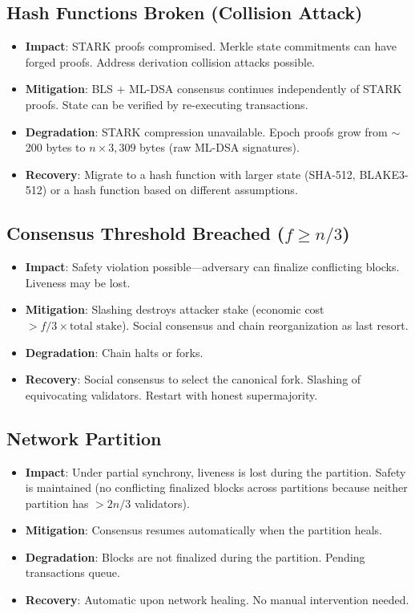 \documentclass[11pt,a4paper]{article}
\begin{document}
\subsection{Hash Functions Broken (Collision Attack)}

\begin{itemize}[leftmargin=2em]
  \item \textbf{Impact}: STARK proofs compromised. Merkle state commitments can have
        forged proofs. Address derivation collision attacks possible.
  \item \textbf{Mitigation}: BLS + ML-DSA consensus continues independently of
        STARK proofs. State can be verified by re-executing transactions.
  \item \textbf{Degradation}: STARK compression unavailable. Epoch proofs grow from
        $\sim$200 bytes to $n \times 3{,}309$ bytes (raw ML-DSA signatures).
  \item \textbf{Recovery}: Migrate to a hash function with larger state (SHA-512,
        BLAKE3-512) or a hash function based on different assumptions.
\end{itemize}

\subsection{Consensus Threshold Breached ($f \geq n/3$)}

\begin{itemize}[leftmargin=2em]
  \item \textbf{Impact}: Safety violation possible---adversary can finalize conflicting
        blocks. Liveness may be lost.
  \item \textbf{Mitigation}: Slashing destroys attacker stake (economic cost $> f/3 \times
        \text{total stake}$). Social consensus and chain reorganization as last resort.
  \item \textbf{Degradation}: Chain halts or forks.
  \item \textbf{Recovery}: Social consensus to select the canonical fork. Slashing of
        equivocating validators. Restart with honest supermajority.
\end{itemize}

\subsection{Network Partition}

\begin{itemize}[leftmargin=2em]
  \item \textbf{Impact}: Under partial synchrony, liveness is lost during the partition.
        Safety is maintained (no conflicting finalized blocks across partitions because
        neither partition has $> 2n/3$ validators).
  \item \textbf{Mitigation}: Consensus resumes automatically when the partition heals.
  \item \textbf{Degradation}: Blocks are not finalized during the partition. Pending
        transactions queue.
  \item \textbf{Recovery}: Automatic upon network healing. No manual intervention needed.
\end{itemize}
\end{document}
